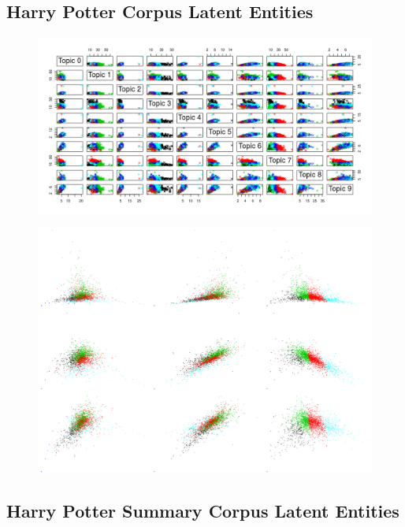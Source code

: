 \documentclass[10pt]{report}
\begin{document}
\clearpage
\subsection{Harry Potter Corpus Latent Entities}
\begin{figure}[h!]
  \centering
  \includegraphics[scale=0.55]{hp_full_latent_entity_scatter}
\caption{\label{fig:hp_le_clusters}}
\end{figure}


\begin{figure}[h!]
  \centering
  \includegraphics[scale=0.14]{hp_le_cluster_zoom}
\caption{\label{fig:hp_le_cluster_zoom}}
\end{figure}



\clearpage
\subsection{Harry Potter Summary Corpus Latent Entities}
\end{document}
